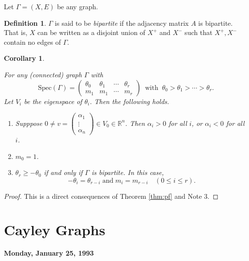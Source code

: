 \documentclass[
]{book}
\newtheorem{corollary}{Corollary}[chapter]
\theoremstyle{definition}
\newtheorem{definition}{Definition}[chapter]
\theoremstyle{definition}
\theoremstyle{definition}
\theoremstyle{definition}
\theoremstyle{remark}
\begin{document}
Let \(\Gamma = (X, E)\) be any graph.

\begin{definition}
\protect\hypertarget{def:bipartite}{}\label{def:bipartite}\(\Gamma\) is said to be \emph{bipartite} if the adjacency matrix \(A\) is bipartite. That is, \(X\) can be written as a disjoint union of \(X^+\) and \(X^-\) such that \(X^+, X^-\) contain no edges of \(\Gamma\).
\end{definition}

\begin{corollary}
\protect\hypertarget{cor:spec}{}\label{cor:spec}

For any (connected) graph \(\Gamma\) with
\[\mathrm{Spec}(\Gamma) = \begin{pmatrix}\theta_0 & \theta_1 &\cdots & \theta_r\\m_1 & m_1 & \cdots & m_r\end{pmatrix} \:\textrm{ with }\: \theta_0 > \theta_1 > \cdots > \theta_r.\]
Let \(V_i\) be the eigenspace of \(\theta_i\). Then the following holds.

\begin{enumerate}
\def\labelenumi{\arabic{enumi}.}
\item
  Supppose \(0\neq v = \begin{pmatrix} \alpha_1\\\vdots \\\alpha_n \end{pmatrix} \in V_0\in \mathbb{R}^n\). Then \(\alpha_i > 0\) for all \(i\), or \(\alpha_i < 0\) for all \(i\).
\item
  \(m_0 = 1\).
\item
  \(\theta_r \geq -\theta_0\) if and only if \(\Gamma\) is bipartite. In this case,
  \[-\theta_i = \theta_{r-i} \; \textrm{and} \; m_i = m_{r-i} \quad (0\leq i\leq r).\]
\end{enumerate}

\end{corollary}

\begin{proof}
This is a direct consequences of Theorem \ref{thm:pf} and Note 3.
\end{proof}

\hypertarget{lec3}{%
\chapter{Cayley Graphs}\label{lec3}}

\textbf{Monday, January 25, 1993}
\end{document}
